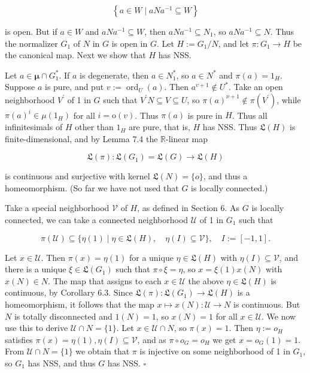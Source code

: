 \documentclass[10pt]{article}
\begin{document}
$$
\left\{a \in W \mid a N a^{-1} \subseteq W\right\}
$$

is open. But if $a \in W$ and $a N a^{-1} \subseteq W$, then $a N a^{-1} \subseteq N_{1}$, so $a N a^{-1} \subseteq N$. Thus the normalizer $G_{1}$ of $N$ in $G$ is open in $G$. Let $H:=G_{1} / N$, and let $\pi: G_{1} \rightarrow H$ be the canonical map. Next we show that $H$ has NSS.

Let $a \in \boldsymbol{\mu} \cap G_{1}^{*}$. If $a$ is degenerate, then $a \in N_{1}^{*}$, so $a \in N^{*}$ and $\pi(a)=1_{H}$. Suppose $a$ is pure, and put $v:=\operatorname{ord}_{U}(a)$. Then $a^{v+1} \notin U^{*}$. Take an open neighborhood $V^{\prime}$ of 1 in $G$ such that $V^{\prime} N \subseteq V \subseteq U$, so $\pi(a)^{\nu+1} \notin \pi\left(V^{\prime}\right)$, while $\pi(a)^{i} \in \mu\left(1_{H}\right)$ for all $i=\mathrm{o}(v)$. Thus $\pi(a)$ is pure in $H$. Thus all infinitesimals of $H$ other than $1_{H}$ are pure, that is, $H$ has NSS. Thus $\mathfrak{L}(H)$ is finite-dimensional, and by Lemma 7.4 the $\mathbb{R}$-linear map

$$
\mathfrak{L}(\pi): \mathfrak{L}\left(G_{1}\right)=\mathfrak{L}(G) \rightarrow \mathfrak{L}(H)
$$

is continuous and surjective with kernel $\mathfrak{L}(N)=\{o\}$, and thus a homeomorphism. (So far we have not used that $G$ is locally connected.)

Take a special neighborhood $\mathcal{V}$ of $H$, as defined in Section 6. As $G$ is locally connected, we can take a connected neighborhood $\mathcal{U}$ of 1 in $G_{1}$ such that

$$
\pi(\mathcal{U}) \subseteq\{\eta(1) \mid \eta \in \mathfrak{L}(H), \quad \eta(I) \subseteq \mathcal{V}\}, \quad I:=[-1,1] .
$$

Let $x \in \mathcal{U}$. Then $\pi(x)=\eta(1)$ for a unique $\eta \in \mathfrak{L}(H)$ with $\eta(I) \subseteq \mathcal{V}$, and there is a unique $\xi \in \mathfrak{L}\left(G_{1}\right)$ such that $\pi \circ \xi=\eta$, so $x=\xi(1) x(N)$ with $x(N) \in N$. The map that assigns to each $x \in \mathcal{U}$ the above $\eta \in \mathfrak{L}(H)$ is continuous, by Corollary 6.3. Since $\mathfrak{L}(\pi): \mathfrak{L}\left(G_{1}\right) \rightarrow \mathfrak{L}(H)$ is a homeomorphism, it follows that the map $x \mapsto x(N): \mathcal{U} \rightarrow N$ is continuous. But $N$ is totally disconnected and $1(N)=1$, so $x(N)=1$ for all $x \in \mathcal{U}$. We now use this to derive $\mathcal{U} \cap N=\{1\}$. Let $x \in \mathcal{U} \cap N$, so $\pi(x)=1$. Then $\eta:=o_{H}$ satisfies $\pi(x)=\eta(1), \eta(I) \subseteq \mathcal{V}$, and as $\pi \circ o_{G}=o_{H}$ we get $x=o_{G}(1)=1$. From $\mathcal{U} \cap N=\{1\}$ we obtain that $\pi$ is injective on some neighborhood of 1 in $G_{1}$, so $G_{1}$ has NSS, and thus $G$ has NSS. \(\square\)
\end{document}
